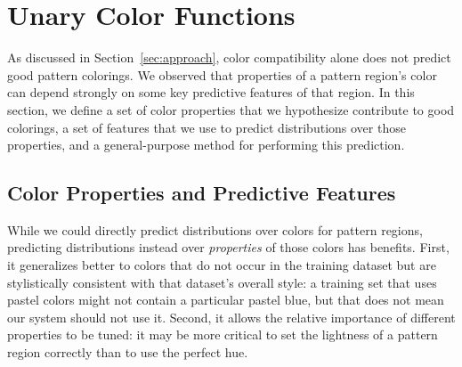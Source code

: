 \section{Unary Color Functions}
\label{sec:unary}

As discussed in Section~\ref{sec:approach}, color compatibility alone does not predict good pattern colorings. We observed that properties of a pattern region's color can depend strongly on some key predictive features of that region. In this section, we define a set of color properties that we hypothesize contribute to good colorings, a set of features that we use to predict distributions over those properties, and a general-purpose method for performing this prediction.

\subsection{Color Properties and Predictive Features}
\label{sec:unaryPropsAndFeatures}

While we could directly predict distributions over colors for pattern regions, predicting distributions instead over \emph{properties} of those colors has benefits. First, it generalizes better to colors that do not occur in the training dataset but are stylistically consistent with that dataset's overall style: a training set that uses pastel colors might not contain a particular pastel blue, but that does not mean our system should not use it. Second, it allows the relative importance of different properties to be tuned: it may be more critical to set the lightness of a pattern region correctly than to use the perfect hue.

